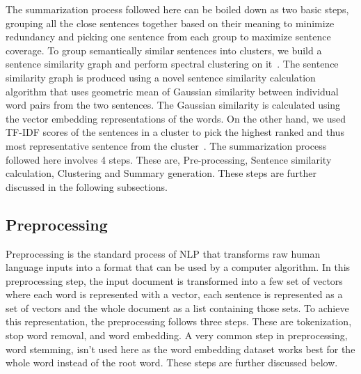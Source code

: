 The summarization process followed here can be boiled down as two basic steps, grouping all the close sentences together based on their meaning to minimize redundancy and picking one sentence from each group to maximize sentence coverage. To group semantically similar sentences into clusters, we build a sentence similarity graph and perform spectral clustering on it~\cite{roychowdhury-etal-2022-spectral-base}. The sentence similarity graph is produced using a novel sentence similarity calculation algorithm that uses geometric mean of Gaussian similarity between individual word pairs from the two sentences. The Gaussian similarity is calculated using the vector embedding representations of the words. On the other hand, we used TF-IDF scores of the sentences in a cluster to pick the highest ranked and thus most representative sentence from the cluster~\cite{Akter-2017-tfidf-3,das-2022-tfidf,sarkar-2012-tfidf,sarkar-2012-tfidf-2}. The summarization process followed here involves 4 steps. These are, Pre-processing, Sentence similarity calculation, Clustering and Summary generation. These steps are further discussed in the following subsections. 

\subsection{Preprocessing}\label{subsec:preprocessing}
Preprocessing is the standard process of NLP that transforms raw human language inputs into a format that can be used by a computer algorithm. In this preprocessing step, the input document is transformed into a few set of vectors where each word is represented with a vector, each sentence is represented as a set of vectors and the whole document as a list containing those sets. To achieve this representation, the preprocessing follows three steps. These are tokenization, stop word removal, and word embedding. A very common step in preprocessing, word stemming, isn't used here as the word embedding dataset works best for the whole word instead of the root word. These steps are further discussed below.\\

